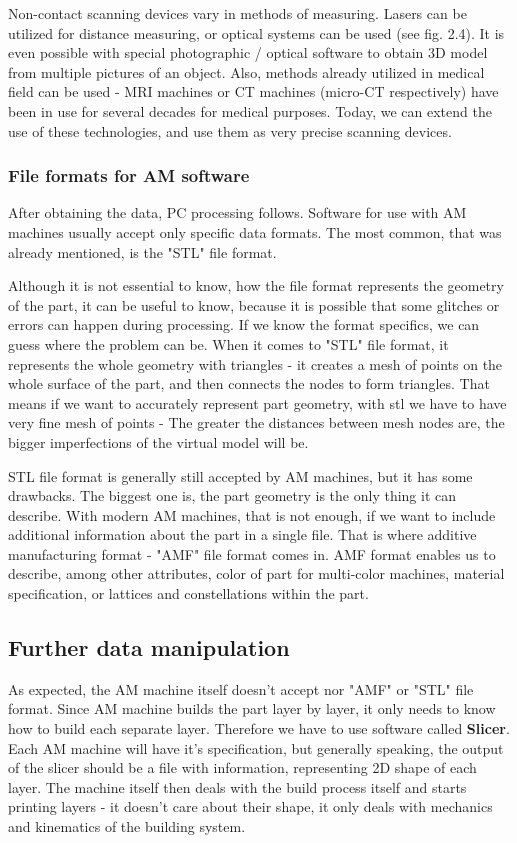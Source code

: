 \documentclass[a4paper, 11pt, reqno]{report}
\begin{document}
    
Non-contact scanning devices vary in methods of measuring. Lasers can be utilized for distance measuring, or optical systems can be used (see fig. 2.4). It is even possible with special photographic / optical software to obtain 3D model from multiple pictures of an object. Also, methods already utilized in medical field can be used - MRI machines or CT machines (micro-CT respectively) have been in use for several decades for medical purposes. Today, we can extend the use of these technologies, and use them as very precise scanning devices.
\subsubsection{File formats for AM software}
After obtaining the data, PC processing follows. Software for use with AM machines usually accept only specific data formats. The most common, that was already mentioned, is the "STL" file format.

	Although it is not essential to know, how the file format represents the geometry of the part, it can be useful to know, because it is possible that some glitches or errors can happen during processing. If we know the format specifics, we can guess where the problem can be. When it comes to "STL" file format, it represents the whole geometry with triangles - it creates a mesh of points on the whole surface of the part, and then connects the nodes to form triangles. That means if we want to accurately represent part geometry, with stl we have to have very fine mesh of points - The greater the distances between mesh nodes are, the bigger imperfections of the virtual model will be.
	
	STL file format is generally still accepted by AM machines, but it has some drawbacks. The biggest one is, the part geometry is the only thing it can describe. With modern AM machines, that is not enough, if we want to include additional information about the part in a single file. That is where additive manufacturing format - "AMF" file format comes in. AMF format enables us to describe, among other attributes, color of part for multi-color machines, material specification, or lattices and constellations within the part.
\subsection{Further data manipulation}
As expected, the AM machine itself doesn't accept nor "AMF" or "STL" file format. Since AM machine builds the part layer by layer, it only needs to know how to build each separate layer. Therefore we have to use software called \textbf{Slicer}. Each AM machine will have it's specification, but generally speaking, the output of the slicer should be a file with information, representing 2D shape of each layer. The machine itself then deals with the build process itself and starts printing layers - it doesn't care about their shape, it only deals with mechanics and kinematics of the building system.
\end{document}
